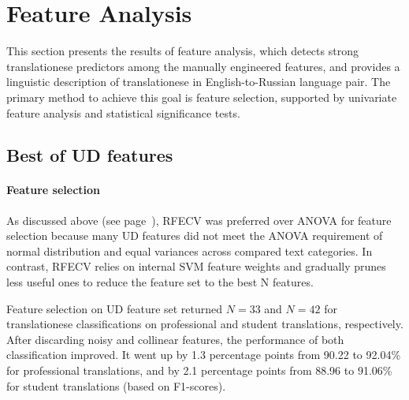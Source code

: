 \section{\label{sec:bestof}Feature Analysis}
This section presents the results of feature analysis, which detects strong translationese predictors among the manually engineered features, and provides a linguistic description of translationese in English-to-Russian language pair.
The primary method to achieve this goal is feature selection, supported by univariate feature analysis and statistical significance tests.

\vspace{-1em}

\subsection{\label{ssec:best_ud}Best of UD features}

\paragraph{\label{par:detect_select}Feature selection}
As discussed above (see page~\pageref{par:featanal_meths}), \gls{RFECV} was preferred over \gls{ANOVA} for feature selection because many UD features did not meet the ANOVA requirement of normal distribution and equal variances across compared text categories. In contrast, RFECV relies on internal SVM feature weights and gradually prunes less useful ones to reduce the feature set to the best N features. 


Feature selection on UD feature set returned $N=33$ and $N=42$ for translationese classifications on professional and student translations, respectively. 
After discarding noisy and collinear features, the performance of both classification improved. It went up by 1.3 percentage points from 90.22 to 92.04\% for professional translations, and by 2.1 percentage points from 88.96 to 91.06\% for student translations (based on F1-scores). %

